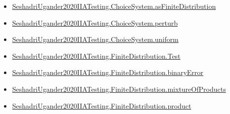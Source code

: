 \documentclass[10pt]{article}
\begin{document}
\begin{itemize}
\item \hyperlink{governing-declaration-84db14e23cd406b0}{Seshadri\allowbreak{}Ugander2020\allowbreak{}IIA\allowbreak{}Testing.\allowbreak{}Choice\allowbreak{}System.\allowbreak{}as\allowbreak{}Finite\allowbreak{}Distribution}
\item \hyperlink{paper-prerequisite-32d90e854afe59fd}{Seshadri\allowbreak{}Ugander2020\allowbreak{}IIA\allowbreak{}Testing.\allowbreak{}Choice\allowbreak{}System.\allowbreak{}perturb}
\item \hyperlink{governing-declaration-2f9ec7a44c87f45e}{Seshadri\allowbreak{}Ugander2020\allowbreak{}IIA\allowbreak{}Testing.\allowbreak{}Choice\allowbreak{}System.\allowbreak{}uniform}
\item \hyperlink{paper-prerequisite-1ae54af4030402fc}{Seshadri\allowbreak{}Ugander2020\allowbreak{}IIA\allowbreak{}Testing.\allowbreak{}Finite\allowbreak{}Distribution.\allowbreak{}Test}
\item \hyperlink{paper-prerequisite-0ee1ced5412e3e3f}{Seshadri\allowbreak{}Ugander2020\allowbreak{}IIA\allowbreak{}Testing.\allowbreak{}Finite\allowbreak{}Distribution.\allowbreak{}binary\allowbreak{}Error}
\item \hyperlink{paper-prerequisite-4cbb8978d5ced12b}{Seshadri\allowbreak{}Ugander2020\allowbreak{}IIA\allowbreak{}Testing.\allowbreak{}Finite\allowbreak{}Distribution.\allowbreak{}mixture\allowbreak{}Of\allowbreak{}Products}
\item \hyperlink{governing-declaration-5fac9c490551d2cc}{Seshadri\allowbreak{}Ugander2020\allowbreak{}IIA\allowbreak{}Testing.\allowbreak{}Finite\allowbreak{}Distribution.\allowbreak{}product}
\end{itemize}
\end{document}
